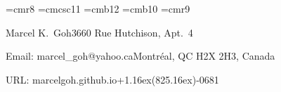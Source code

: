 
\def\today{\ifcase\month\or
  January\or February\or March\or April\or May\or June\or
  July\or August\or September\or October\or November\or December\fi
  \space\number\day, \number\year}
\newcount\twodigits
\def\hours{\twodigits=\time \divide\twodigits by 60 \printtwodigits
  \multiply\twodigits by-60 \advance\twodigits by\time :\printtwodigits}
\def\gobbleone1{}
\def\printtwodigits{\advance\twodigits100
  \expandafter\gobbleone\number\twodigits
  \advance\twodigits-100 }

\font\eightrm=cmr8
\font\elevensc=cmcsc11  %
\font\bigbold=cmb12  %
\font\tenb=cmb10
\font\mc=cmr9

\let\tenbf=\tenb

\newdimen\itemindent
\newif\ifitempar \itempartrue
\def\itemindentset#1{\setbox0\hbox{{\bf #1.\kern.25em}}\itemindent=\wd0\relax}
\def\pubbegin #1{\itemindentset{#11}} %
\def\ppubbegin #1{\itemindentset{#111}} %
\def\pubitem#1.{\ifitempar\smallskip\noindent\else\itempartrue
  \hskip-\parindent\fi
  \hbox to\itemindent{\bf\hfil #1.\kern.25em}%
  \hangindent=\itemindent\hangafter=1\ignorespaces}

\def\up#1{\leavevmode \raise.16ex\hbox{#1}}
\def\sectheader#1{{\bigskip\elevensc #1}\smallskip\hrule\medskip}
\def\leftright#1#2{{#1}\hfill{#2}\par}
\def\myname{{\tensc Marcel K. Goh}}
\def\CEE{{\mc C}}
\def\UNIX{{\mc UNIX}}
\def\thing{\item{$\bullet$}}

\parindent=0pt  %

\newcount\submittedcount
{}
\def\subitem{\pubitem S\the\submittedcount. \global\advance\submittedcount by 1}
\newcount\reportcount
{}
\def\repitem{\pubitem R\the\reportcount. \global\advance\reportcount by 1}

\def\datethis{\eightrm Last updated \today\ at\ \hours.}



\leftright{\bigbold Marcel K.\ Goh}{3660 Rue Hutchison, Apt.\ 4}
\leftright{Email: marcel\_goh@yahoo.ca}{Montr\'eal, QC H2X 2H3, Canada}
\leftright{URL: marcelgoh.github.io}{+1\thinspace\up(825\up)\thinspace 440-0681}


